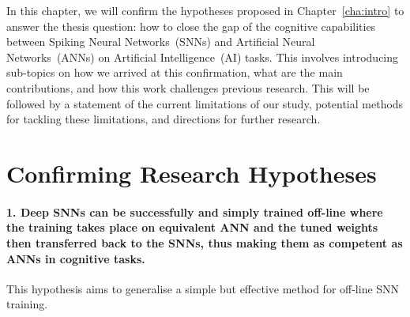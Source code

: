 

In this chapter, we will confirm the hypotheses proposed in Chapter~\ref{cha:intro} to answer the thesis question: how to close the gap of the cognitive capabilities between Spiking Neural Networks~(SNNs) and Artificial Neural Networks~(ANNs) on Artificial Intelligence~(AI) tasks.
This involves introducing sub-topics on how we arrived at this confirmation, what are the main contributions, and how this work challenges previous research.
This will be followed by a statement of the current limitations of our study, potential methods for tackling these limitations, and directions for further research.



\section{Confirming Research Hypotheses}
\paragraph{1. Deep SNNs can be successfully and simply trained off-line where the training takes place on equivalent ANN and the tuned weights then transferred back to the SNNs, thus making them as competent as ANNs in cognitive tasks.}
This hypothesis aims to generalise a simple but effective method for off-line SNN training.

